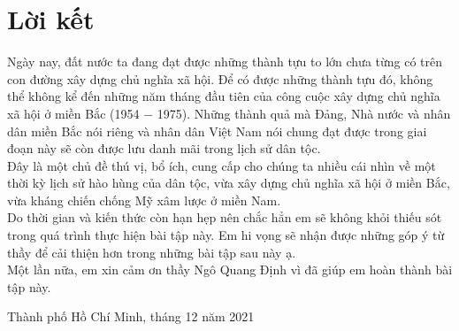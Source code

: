 \section{Lời kết}
Ngày nay, đất nước ta đang đạt được những thành tựu to lớn chưa từng có trên con đường xây dựng chủ nghĩa xã hội. Để có được những thành tựu đó, không thể không kể đến những năm tháng đầu tiên của công cuộc xây dựng chủ nghĩa xã hội ở miền Bắc (1954 $-$ 1975). Những thành quả mà Đảng, Nhà nước và nhân dân miền Bắc nói riêng và nhân dân Việt Nam nói chung đạt được trong giai đoạn này sẽ còn được lưu danh mãi trong lịch sử dân tộc.\\ 
Đây là một chủ đề thú vị, bổ ích, cung cấp cho chúng ta nhiều cái nhìn về một thời kỳ lịch sử hào hùng của dân tộc, vừa xây dựng chủ nghĩa xã hội ở miền Bắc, vừa kháng chiến chống Mỹ xâm lược ở miền Nam.\\
Do thời gian và kiến thức còn hạn hẹp nên chắc hẳn em sẽ không khỏi thiếu sót trong quá trình thực hiện bài tập này. Em hi vọng sẽ nhận được những góp ý từ thầy để cải thiện hơn trong những bài tập sau này ạ.\\
Một lần nữa, em xin cảm ơn thầy Ngô Quang Định vì đã giúp em hoàn thành bài tập này.
\begin{flushright}
Thành phố Hồ Chí Minh, tháng 12 năm 2021
\end{flushright}